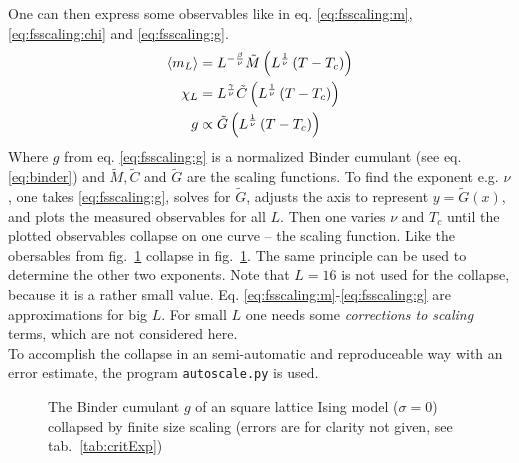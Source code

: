     One can then express some observables like in eq. \eqref{eq:fsscaling:m}, \eqref{eq:fsscaling:chi} and
    \eqref{eq:fsscaling:g}.
    \begin{align}
        \label{eq:fsscaling:m}
        \left< m_L \right> &= L^{-\frac{\beta}{\nu}} \tilde{M}\left(L^\frac{1}{\nu}\left(T-T_c\right)\right)\\
        \label{eq:fsscaling:chi}
        \chi_L    &= L^{\frac{\gamma}{\nu}} \tilde{C}\left(L^\frac{1}{\nu}\left(T-T_c\right)\right)\\
        \label{eq:fsscaling:g}
        g         &\propto \tilde{G}\left(L^\frac{1}{\nu}\left(T-T_c\right)\right)
    \end{align}
    Where \(g\) from eq. \eqref{eq:fsscaling:g} is a normalized
    Binder cumulant (see eq. \eqref{eq:binder}) and \(\tilde{M}, \tilde{C}\) and \(\tilde{G}\)
    are the scaling functions.
    To find the exponent e.g. \(\nu\), one takes \eqref{eq:fsscaling:g},
    solves for \(\tilde{G}\), adjusts the axis to represent \(y=\tilde{G}(x)\),
    and plots the measured observables for all \(L\).
    Then one varies \(\nu\) and \(T_{c}\) until the plotted observables
    collapse on one curve -- the scaling function.
    Like the obersables from fig.\ \ref{fig:gettingCrit}
    collapse in fig.\ \ref{fig:gettingCrit}.
    The same principle can be used to determine the other two exponents.
    Note that \(L=16\) is not used for the collapse, because it is a
    rather small value. Eq. \eqref{eq:fsscaling:m}-\eqref{eq:fsscaling:g}
    are approximations for big \(L\). For small \(L\) one needs some
    \emph{corrections to scaling} terms, which are not considered here.\\
    To accomplish the collapse in an semi-automatic and reproduceable
    way with an error estimate, the program
    \texttt{autoscale.py} \cite{autoscale2009} is used.
    \begin{figure}[htbp]
        \centering
        \caption[Examples of Determining Critical Temperature and Exponents]
        {
             The Binder cumulant \(g\)
                of an square lattice Ising model (\(\sigma=0\))\\
             collapsed by finite
                size scaling (errors are for clarity not given, see tab.\ \ref{tab:critExp})
        }
        \label{fig:gettingCrit}
    \end{figure}\\
